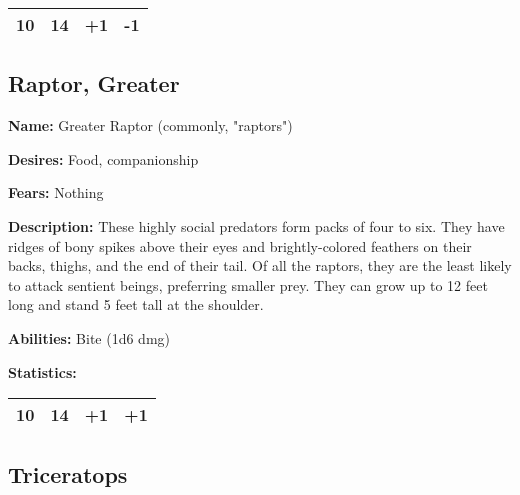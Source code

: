 \begin{multicols}{2}
\begin{center}
{
\begin{xtabular}{|l|l|l|l|}
10 & 14 & +1 & -1 \\
\hline
\end{xtabular}
}
\end{center}

\subsection{Raptor, Greater}

\textbf{Name:} Greater Raptor (commonly, "raptors") 

\textbf{Desires:} Food, companionship

\textbf{Fears:} Nothing

\textbf{Description:} These highly social predators form packs of four to six. They
have ridges of bony spikes above their eyes and brightly-colored feathers on their
backs, thighs, and the end of their tail. Of all the raptors, they are the least
likely to attack sentient beings, preferring smaller prey. They can grow up to 12
feet long and stand 5 feet tall at the shoulder.

\textbf{Abilities:} Bite (1d6 dmg)

\textbf{Statistics:}

\begin{center}
{
\begin{xtabular}{|l|l|l|l|}
10 & 14 & +1 & +1 \\
\hline
\end{xtabular}
}
\end{center}

\subsection{Triceratops}


\end{multicols}
